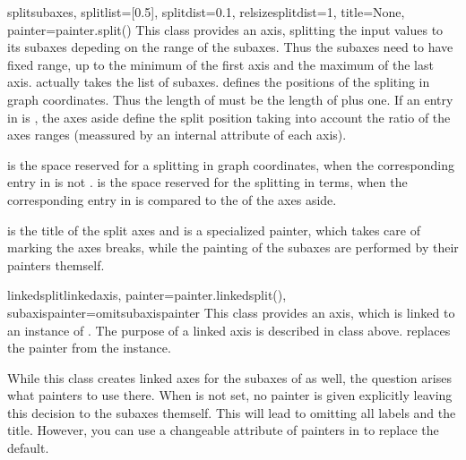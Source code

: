 \begin{classdesc}{split}{subaxes, splitlist=[0.5],
                         splitdist=0.1, relsizesplitdist=1,
                         title=None, painter=painter.split()}
  This class provides an axis, splitting the input values to its
  subaxes depeding on the range of the subaxes. Thus the subaxes
  need to have fixed range, up to the minimum of the first axis and
  the maximum of the last axis.  actually takes the list
  of subaxes.  defines the positions of the spliting
  in graph coordinates. Thus the length of  must be the
  length of  plus one. If an entry in 
  is , the axes aside define the split position taking into
  account the ratio of the axes ranges (meassured by an internal
   attribute of each axis).

   is the space reserved for a splitting in graph
  coordinates, when the corresponding entry in  is not
  .  is the space reserved for the
  splitting in terms, when the corresponding entry in 
  is  compared to the  of the axes aside.

   is the title of the split axes and  is a
  specialized painter, which takes care of marking the axes breaks,
  while the painting of the subaxes are performed by their painters
  themself.
\end{classdesc}

\begin{classdesc}{linkedsplit}{linkedaxis,
                               painter=painter.linkedsplit(),
                               subaxispainter=omitsubaxispainter}
  This class provides an axis, which is linked to an instance of
  . The purpose of a linked axis is described in class
   above.  replaces the painter from the
   instance.

  While this class creates linked axes for the subaxes of
   as well, the question arises what painters to use
  there. When  is not set, no painter is given
  explicitly leaving this decision to the subaxes themself. This will
  lead to omitting all labels and the title. However, you can use a
  changeable attribute of painters in  to replace
  the default.
\end{classdesc}

